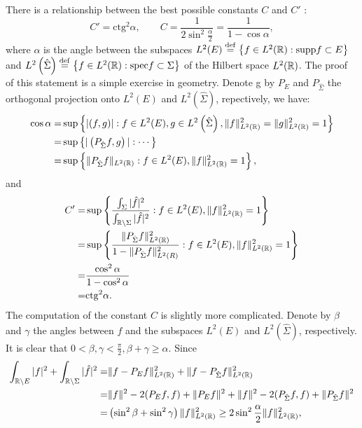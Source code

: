   There is a relationship between the best possible constants  $C$ and $C'$ :
  \[
    C'=\mathrm{ctg}^2\alpha, \qquad C=\frac{1}{2\sin^2 \frac{\alpha}{2}}=\frac{1}{1-\cos\alpha},
  \] 
  where $\alpha$ is the angle between the subspaces $L^2(E)\overset{\mathrm{def}}{=}\left\{ f\in L^2(\mathbb{R}):\mathrm{supp}f \subset  E \right\} $ and $L^2\left( \hat{\Sigma} \right) \overset{\mathrm{def}}{=}\left\{ f\in L^2(\mathbb{R}):\mathrm{spec}f\subset \Sigma \right\} $ of the Hilbert space $L^2(\mathbb{R})$. The proof of this statement is a simple exercise in geometry. Denote g by $P_{E}$ and $P_{\hat{\Sigma}}$ the orthogonal projection onto $L^2(E)$ and $L^2(\hat{\Sigma})$, repectively, we have:
  \begin{equation*}
    \begin{aligned}
      \cos \alpha = & \sup\left\{ |(f,g)|:f\in L^2(E),g\in L^2\left( \hat{\Sigma} \right), \|f\|^2_{L^2(\mathbb{R})}=\|g\|^2_{L^2(\mathbb{R})}=1  \right\}\\
      = & \sup\left\{ |\left( P_{\hat{\Sigma}}f,g \right) |:\cdots \right\} \\
      = & \sup\left\{ \|P_{\hat{\Sigma}}f\|_{L^2(\mathbb{R})}:f\in L^2(E),\|f\|^2_{L^2(\mathbb{R})}=1 \right\}, 
    \end{aligned}
  \end{equation*}
  and
  \begin{equation*}
    \begin{aligned}
      C' = & \sup\left\{ \frac{\int_{\Sigma}|\hat{f}|^2}{\int_{\mathbb{R}\backslash \Sigma}|\hat{f}|^2}:f\in L^2(E),\|f\|^2_{L^2(\mathbb{R})}=1 \right\} \\
      = & \sup \left\{ \frac{\|P_{\hat{\Sigma}}f\|^2_{L^2(\mathbb{R})}}{1-\|P_{\hat{\Sigma}}f\|^2_{L^2(R)}}:f\in L^2(E), \|f\|^2_{L^2(\mathbb{R})}=1 \right\} \\
      = & \frac{\cos^2\alpha}{1-\cos^2\alpha}\\
      = & \mathrm{ctg}^2\alpha.
    \end{aligned}
  \end{equation*}
  The computation of the constant $C$ is slightly more complicated. Denote by $\beta$ and $\gamma$ the angles between $f$ and the subspaces $L^2(E)$ and $L^2\left( \hat{\Sigma} \right) $, respectively. It is clear that $0<\beta,\gamma<\frac{\pi}{2},\beta+\gamma\ge \alpha$. Since 
  \begin{equation*}
    \begin{aligned}
      \int_{\mathbb{R}\backslash E}|f|^2+\int_{\mathbb{R}\backslash \Sigma}|\hat{f}|^2= & \|f-P_Ef\|^2_{L^2(\mathbb{R})}+\|f-P_{\hat{\Sigma}}f\|^2_{L^2(\mathbb{R})}\\
      = & \|f\|^2-2(P_Ef,f)+\|P_Ef\|^2+\|f\|^2-2(P_{\hat{\Sigma}}f,f)+\|P_{\hat{\Sigma}}f\|^2\\
      = & \left( \sin^2\beta+\sin^2\gamma \right) \|f\|^2_{L^2(\mathbb{R})} \ge 2\sin^2 \frac{\alpha}{2}\|f\|^2_{L^2(\mathbb{R})},
    \end{aligned}
  \end{equation*}
